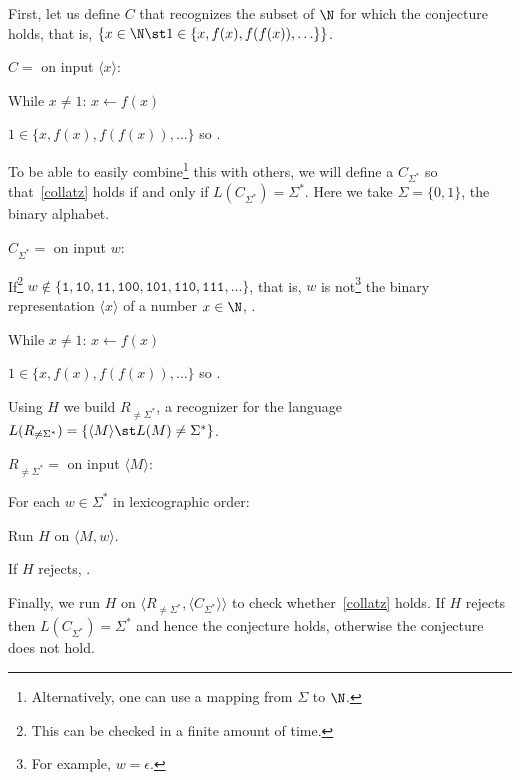First, let us define \TM{} \(C\) that recognizes
the subset of \(\N\)
for which the conjecture holds, that is, \(\{x \in \N \st 1 \in
\{x,f(x),f(f(x)),\ldots\} \}\).

\begin{TMachine}{\(C =\) on input \(\langle x \rangle\):}
\item[1.] While \(x \neq 1\): \(x \gets f(x)\)
\item[2.] \(1 \in \{x,f(x),f(f(x)),\ldots\}\) so \accept.
\end{TMachine}

To be able to easily combine\footnote{Alternatively, one can use a mapping from
\(\Sigma\) to \(\N\).} this \TM{} with others, we will define
a \TM{} \(C_{\Sigma^*}\) so that~\ref{collatz} holds if and only if
\(L(C_{\Sigma^*}) =
		\Sigma^*\). Here we take \(\Sigma = \{0,1\}\), the binary alphabet.

\begin{TMachine}{\(C_{\Sigma^*} =\) on input \(w\):}
\item[1.] If\footnote{This can be checked in a finite amount of time.} \(w \not\in
\{\texttt{1},\texttt{10},\texttt{11},\texttt{100},\texttt{101},\texttt{110},\texttt{111},\ldots\}\),
that is, \(w\) is not\footnote{For example, \(w
	= \epsilon\).} the binary representation \(\langle x \rangle\)
		of a number \(x \in \N\), \accept.
	\item[2.] While \(x \neq 1\): \(x \gets f(x)\)
	\item[3.] \(1 \in \{x,f(x),f(f(x)),\ldots\}\) so \accept.
\end{TMachine}

Using \(H\) we build \(R_{\neq \Sigma^*}\), a recognizer for the language
\(L(R_{\neq \Sigma^*}) = \{\langle M\rangle\st L(M) \neq \Sigma^*\}\).

\begin{TMachine}{\(R_{\neq \Sigma^*} =\) on input \(\langle M \rangle\):}
	\item[1.] For each \(w \in \Sigma^*\) in lexicographic order:
	\item[1.1.] Run \(H\) on \(\langle M , w \rangle\).
	\item[1.2.] If \(H\) rejects, \accept.
\end{TMachine}

Finally, we run \(H\) on \(\langle R_{\neq \Sigma^*}, \langle C_{\Sigma^*} \rangle
		\rangle\) to check whether~\ref{collatz} holds. If \(H\) rejects then
		\(L(C_{\Sigma^*}) = \Sigma^*\) and hence the conjecture holds, otherwise the
		conjecture does not hold.




